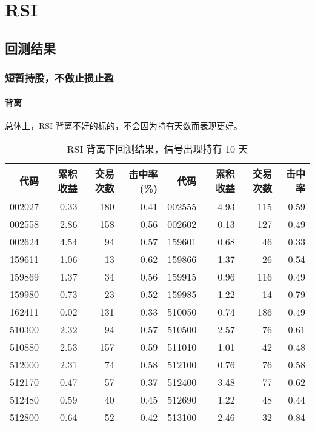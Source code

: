 \chapter{RSI}
\section{回测结果}
\subsection{短暂持股，不做止损止盈}
\subsubsection*{背离}
总体上，RSI 背离不好的标的，不会因为持有天数而表现更好。
\begin{table}
    \centering
    \caption{RSI 背离下回测结果，信号出现持有 10 天}
    \begin{tabular}{rrrrrrrr}
        \hline
        代码     & 累积收益 & 交易次数 & 击中率(\%) & 代码     & 累积收益 & 交易次数 & 击中率  \\
        \hline
        002027 & 0.33 & 180  & 0.41    & 002555 & 4.93 & 115  & 0.59 \\
        002558 & 2.86 & 158  & 0.56    & 002602 & 0.13 & 127  & 0.49 \\
        002624 & 4.54 & 94   & 0.57    & 159601 & 0.68 & 46   & 0.33 \\
        159611 & 1.06 & 13   & 0.62    & 159866 & 1.37 & 26   & 0.54 \\
        159869 & 1.37 & 34   & 0.56    & 159915 & 0.96 & 116  & 0.49 \\
        159980 & 0.73 & 23   & 0.52    & 159985 & 1.22 & 14   & 0.79 \\
        162411 & 0.02 & 131  & 0.33    & 510050 & 0.74 & 186  & 0.49 \\
        510300 & 2.32 & 94   & 0.57    & 510500 & 2.57 & 76   & 0.61 \\
        510880 & 2.53 & 157  & 0.59    & 511010 & 1.01 & 42   & 0.48 \\
        512000 & 2.31 & 74   & 0.58    & 512100 & 0.76 & 76   & 0.58 \\
        512170 & 0.47 & 57   & 0.37    & 512400 & 3.48 & 77   & 0.62 \\
        512480 & 0.59 & 40   & 0.45    & 512690 & 1.22 & 48   & 0.44 \\
        512800 & 0.64 & 52   & 0.42    & 513100 & 2.46 & 32   & 0.84 \\

\end{tabular}
\end{table}
